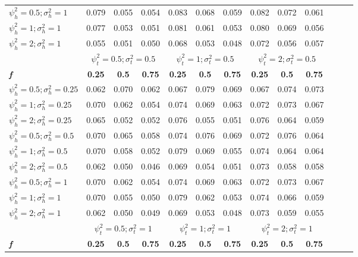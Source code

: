 \begin{table}[ht]
{\begin{tabular}{l c c c c c c c c c c c c}
$\psi_h^2 = 0.5; \sigma_h^2 = 1$ & 0.079 & 0.055 & 0.054 & 0.083 & 0.068 & 0.059 & 0.082 & 0.072 & 0.061 \\
$\psi_h^2 = 1; \sigma_h^2 = 1$ & 0.077 & 0.053 & 0.051 & 0.081 & 0.061 & 0.053 & 0.080 & 0.069 & 0.056 \\
$\psi_h^2 = 2; \sigma_h^2 = 1$ & 0.055 & 0.051 & 0.050 & 0.068 & 0.053 & 0.048 & 0.072 & 0.056 & 0.057 \\
\hline 
 & \multicolumn{3}{c}{$\psi_t^2 = 0.5; \sigma_t^2 = 0.5$} & \multicolumn{3}{c}{$\psi_t^2 = 1; \sigma_t^2 = 0.5$} & \multicolumn{3}{c}{$\psi_t^2= 2; \sigma_t^2 = 0.5$} \\
\addlinespace[1pt]
\cmidrule(lr){2-4} \cmidrule(lr){5-7} \cmidrule(lr){8-10}
\textbf{\textit{f}} & \textbf{0.25} & \textbf{0.5} & \textbf{0.75} & \textbf{0.25} & \textbf{0.5} & \textbf{0.75} & \textbf{0.25} & \textbf{0.5} & \textbf{0.75} \\
\hline
$\psi_h^2 = 0.5; \sigma_h^2 = 0.25$ & 0.062 & 0.070 & 0.062 & 0.067 & 0.079 & 0.069 & 0.067 & 0.074 & 0.073 \\
$\psi_h^2 = 1; \sigma_h^2 = 0.25$ & 0.070 & 0.062 & 0.054 & 0.074 & 0.069 & 0.063 & 0.072 & 0.073 & 0.067 \\
$\psi_h^2 = 2; \sigma_h^2 = 0.25$ & 0.065 & 0.052 & 0.052 & 0.076 & 0.055 & 0.051 & 0.076 & 0.064 & 0.059 \\
$\psi_h^2 = 0.5; \sigma_h^2 = 0.5$ & 0.070 & 0.065 & 0.058 & 0.074 & 0.076 & 0.069 & 0.072 & 0.076 & 0.064 \\
$\psi_h^2 = 1; \sigma_h^2 = 0.5$ & 0.070 & 0.058 & 0.052 & 0.079 & 0.069 & 0.055 & 0.074 & 0.064 & 0.064 \\
$\psi_h^2 = 2; \sigma_h^2 = 0.5$ & 0.062 & 0.050 & 0.046 & 0.069 & 0.054 & 0.051 & 0.073 & 0.058 & 0.058 \\
$\psi_h^2 = 0.5; \sigma_h^2 = 1$ & 0.070 & 0.062 & 0.054 & 0.074 & 0.069 & 0.063 & 0.072 & 0.073 & 0.067 \\
$\psi_h^2 = 1; \sigma_h^2 = 1$ & 0.070 & 0.055 & 0.050 & 0.079 & 0.062 & 0.053 & 0.074 & 0.066 & 0.059 \\
$\psi_h^2 = 2; \sigma_h^2 = 1$ & 0.062 & 0.050 & 0.049 & 0.069 & 0.053 & 0.048 & 0.073 & 0.059 & 0.055 \\
\hline 
 & \multicolumn{3}{c}{$\psi_t^2 = 0.5; \sigma_t^2 = 1$} & \multicolumn{3}{c}{$\psi_t^2 = 1; \sigma_t^2 = 1$} & \multicolumn{3}{c}{$\psi_t^2 = 2; \sigma_t^2 = 1$} \\
\addlinespace[1pt]
\cmidrule(lr){2-4} \cmidrule(lr){5-7} \cmidrule(lr){8-10}
\textbf{\textit{f}} & \textbf{0.25} & \textbf{0.5} & \textbf{0.75} & \textbf{0.25} & \textbf{0.5} & \textbf{0.75} & \textbf{0.25} & \textbf{0.5} & \textbf{0.75} \\

\end{tabular}}
\end{table}
